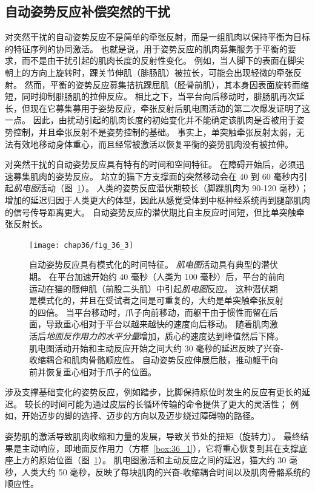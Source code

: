 \subsection{自动姿势反应补偿突然的干扰}

对突然干扰的自动姿势反应不是简单的牵张反射，而是一组肌肉以保持平衡为目标的特征序列的协同激活。
也就是说，用于姿势反应的肌肉募集服务于平衡的要求，而不是由干扰引起的肌肉长度的反射性变化。
例如，当人脚下的表面在脚尖朝上的方向上旋转时，踝关节伸肌（腓肠肌）被拉长，可能会出现轻微的牵张反射。
然而，平衡的姿势反应募集拮抗踝屈肌（胫骨前肌），其本身因表面旋转而缩短，同时抑制腓肠肌的拉伸反应。
相比之下，当平台向后移动时，腓肠肌再次延长，但现在它募集募用于姿势反应，牵张反射后肌电图活动的第二次爆发证明了这一点。
因此，由扰动引起的肌肉长度的初始变化并不能确定该肌肉是否被用于姿势控制，并且牵张反射不是姿势控制的基础。
事实上，单突触牵张反射太弱，无法有效地移动身体重心，而且经常被激活以恢复平衡的姿势肌肉没有被拉伸。


对突然干扰的自动姿势反应具有特有的时间和空间特征。 在障碍开始后，必须迅速募集肌肉的姿势反应。
站立的猫下方支撑面的突然移动会在 40 到 60 毫秒内引起\textit{肌电图}活动（图~\ref{fig:36_3}）。
人类的姿势反应潜伏期较长（脚踝肌肉为 90-120 毫秒）；
增加的延迟归因于人类更大的体型，因此从感觉受体到中枢神经系统再到腿部肌肉的信号传导距离更大。
自动姿势反应的潜伏期比自主反应时间短，但比单突触牵张反射长。


\begin{figure}[htbp]
	\centering
	\texttt{[image: chap36/fig\_36\_3]}
	\caption{自动姿势反应具有模式化的时间特征。
		\textit{肌电图}活动具有典型的潜伏期。
		在平台加速开始约 40 毫秒（人类为 100 毫秒）后，平台的前向运动在猫的髋伸肌（前股二头肌）中引起\textit{肌电图}反应。
		这种潜伏期是模式化的，并且在受试者之间是可重复的，大约是单突触牵张反射的四倍。
		当平台移动时，爪子向前移动，而躯干由于惯性而留在后面，导致重心相对于平台以越来越快的速度向后移动。
		随着肌肉激活后\textit{地面反作用力的水平分量}增加，质心的速度达到峰值然后下降。
		肌电图活动开始和主动反应开始之间大约 30 毫秒的延迟反映了兴奋-收缩耦合和肌肉骨骼顺应性。
		自动姿势反应伸展后肢，推动躯干向前并恢复重心相对于爪子的位置。}
	\label{fig:36_3}
\end{figure}


涉及支撑基础变化的姿势反应，例如踏步，比脚保持原位时发生的反应有更长的延迟。
较长的时间可能为通过皮层的长循环传输的命令提供了更大的灵活性；
例如，开始迈步的脚的选择、迈步的方向以及迈步绕过障碍物的路径。


姿势肌的激活导致肌肉收缩和力量的发展，导致关节处的扭矩（旋转力）。
最终结果是主动响应，即地面反作用力（方框~\ref{box:36_1}），它将重心恢复到其在支撑底座上方的原始位置（图~\ref{fig:36_3}）。
肌电图激活和主动反应之间的延迟，猫大约 30 毫秒，人类大约 50 毫秒，反映了每块肌肉的兴奋-收缩耦合时间以及肌肉骨骼系统的顺应性。


